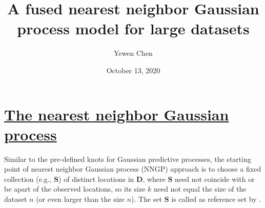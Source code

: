 \documentclass[
12pt, %
a4paper, %
oneside, %
headinclude,footinclude, %
BCOR5mm, %
]{scrartcl}
\title{{A fused nearest neighbor Gaussian process model for large datasets}} %
\author{{Yewen Chen}} %
\date{\normalsize{October 13, 2020}}
\begin{document}
\renewcommand{\UrlFont}{\small\tt}

\setlength{\abovecaptionskip}{0pt}
\setlength{\belowcaptionskip}{10pt}
\renewcommand{\algorithmicrequire}{\textbf{Input:}}  %
\renewcommand{\algorithmicensure}{\textbf{Update step:}} %
\renewcommand{\sectionmark}[1]{\markright{\spacedlowsmallcaps{#1}}} %
\lehead{\mbox{\llap{\small\thepage\kern1em\color{halfgray} \vline}\color{halfgray}\hspace{0.5em}\rightmark\hfil}} %

\pagestyle{scrheadings} %


\maketitle %

\setcounter{tocdepth}{4} %

\tableofcontents %

\listoffigures %

\listoftables %

\newpage
\section{\href{https://chenyw68.github.io/Literature[2020]spNNGP R package for Nearest Neighbor Gaussian Process models.pdf}{The nearest neighbor Gaussian process}}
Similar to the pre-defined knots for Gaussian predictive processes, the starting point of nearest neighbor Gaussian process (NNGP) approach is to choose a fixed collection (e.g.,  $\boldsymbol{S}$) of distinct locations in $\boldsymbol{D}$, where $\boldsymbol{S}$ need not coincide with or be apart of the
observed locations, so its size $k$ need not equal the size of the dataset $n$ (or \textcolor[rgb]{0.50,0.50,0.50}{even larger than the size $n$}). The set $\boldsymbol{S}$ is called as reference set by
\href{https://chenyw68.github.io/Literature/[2016]Hierarchical nearest-neighbor Gaussian process models for large geostatistical datasets.pdf}{\cite{datta2016hierarchical}}.
\end{document}
